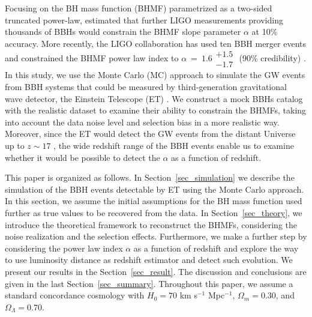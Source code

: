 \documentclass[twocolumn]{aastex62}
\begin{document}
Focusing on the BH mass function (BHMF) parametrized as a two-sided truncated power-law, \citet{Kovetz2017PhRvD} estimated that further LIGO measurements providing thousands of BBHs would constrain the BHMF slope parameter $\alpha$ at 10\% accuracy. More recently, the LIGO collaboration has used ten BBH merger events and constrained the BHMF power law index to $\alpha~=~1.6\substack{+1.5\\-1.7}$ (90\% credibility) \citep{Abbott2018b}. 
In this study, we use the Monte Carlo (MC) approach to simulate the GW events from BBH systems that could be measured by third-generation gravitational wave detector, the Einstein Telescope (ET) \citep{Abernathy2011}. We construct a mock BBHs catalog with the realistic dataset to examine their ability to constrain the BHMFs, taking into account the data noise level and selection bias in a more realistic way. Moreover, since the ET would detect the GW events from the distant Universe up to $z\sim17$ \citep{Abernathy2011}, the wide redshift range of the BBH events enable us to examine whether it would be possible to detect the $\alpha$ as a function of redshift.

This paper is organized as follows. In Section~\ref{sec_simulation} we describe the simulation of the BBH events detectable by ET using the Monte Carlo approach. In this section, we assume the initial assumptions for the BH mass function used further as true values to be recovered from the data. In Section~\ref{sec_theory}, we introduce the theoretical framework to reconstruct the BHMFs, considering the noise realization and the selection effects. Furthermore, we make a further step by considering the power law index $\alpha$ as a function of redshift and explore the way to use luminosity distance as redshift estimator and detect such evolution. We present our results in the Section~\ref{sec_result}. The discussion and conclusions are given in the last Section~\ref{sec_summary}. 
Throughout this paper, we assume a standard concordance cosmology with $H_0= 70$ km s$^{-1}$ Mpc$^{-1}$, $\Omega{_m} = 0.30$, and $\Omega{_\Lambda} = 0.70$.

\vspace{1cm}
\end{document}
